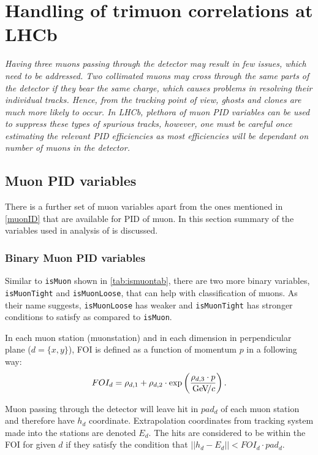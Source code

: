 \chapter{Handling of trimuon correlations at LHCb}
\label{chap:trimuon}

\textit{Having three muons passing through the detector may result in few issues, which need to be addressed. Two collimated muons may cross through the same parts of the detector if they bear the same charge, which causes problems in resolving their individual tracks. Hence, from the tracking point of view, ghosts and clones are much more likely to occur. In LHCb, plethora of muon \Gls{PID} variables can be used to suppress these types of spurious tracks, however, one must be careful once estimating the relevant \gls{PID} efficiencies as most efficiencies will be dependant on number of muons in the detector.}

\section{Muon PID variables }
There is a further set of muon variables apart from the ones mentioned in \autoref{muonID} that are available for \gls{PID} of muon. In this section summary of the variables used in analysis of \Bmumumu is discussed.

\subsection{Binary Muon PID variables }
Similar to \texttt{isMuon} shown in \autoref{tab:ismuontab}, there are two more binary variables, \texttt{isMuonTight} and \texttt{isMuonLoose}, that can help with classification of muons. As their name suggests, \texttt{isMuonLoose} has weaker and \texttt{isMuonTight} has stronger conditions to satisfy as compared to \texttt{isMuon}. 

In each muon station (\gls{muonstation}) and in each dimension in perpendicular plane ($d=\{x,y\}$), \gls{FOI} is defined as a function of momentum $p$  in a following way:
\begin{equation}
	FOI_{d}=\rho_{d,1}+\rho_{d,2}\cdot \exp \left(\frac{\rho_{d,3}\cdot p}{{\mathrm{\,Ge\kern -0.1em V\!/}c}} \right).
\end{equation}

Muon passing through the detector will leave hit in $pad_{d}$ of each muon station and therefore have $h_{d}$ coordinate. Extrapolation coordinates from tracking system made into the stations are denoted $E_{d}$. The hits are considered to be within the \gls{FOI} for given $d$ if they satisfy the condition that $|| h_{d} - E_{d} || < FOI_{d} \cdot pad_{d}$. 

